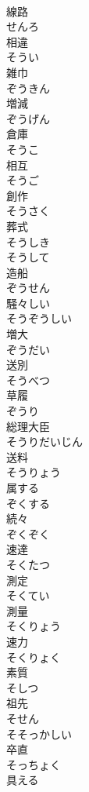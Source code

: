 \documentclass[8pt]{extreport}
\begin{document}
\begin{CJK}{UTF8}{min}
\\	線路 
\\	せんろ	
\\	相違 
\\	そうい	
\\	雑巾 
\\	ぞうきん	
\\	増減 
\\	ぞうげん	
\\	倉庫 
\\	そうこ	
\\	相互 
\\	そうご	
\\	創作 
\\	そうさく	
\\	葬式 
\\	そうしき	
\\	そうして	
\\	造船 
\\	ぞうせん	
\\	騒々しい 
\\	そうぞうしい	
\\	増大 
\\	ぞうだい	
\\	送別 
\\	そうべつ	
\\	草履 
\\	ぞうり	
\\	総理大臣 
\\	そうりだいじん	
\\	送料 
\\	そうりょう	
\\	属する 
\\	ぞくする	
\\	続々 
\\	ぞくぞく	
\\	速達 
\\	そくたつ	
\\	測定 
\\	そくてい	
\\	測量 
\\	そくりょう	
\\	速力 
\\	そくりょく	
\\	素質 
\\	そしつ	
\\	祖先 
\\	そせん	
\\	そそっかしい	
\\	卒直 
\\	そっちょく	
\\	具える 

\end{CJK}
\end{document}
